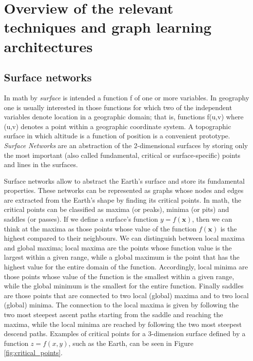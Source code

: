 \chapter{Overview of the relevant techniques and graph learning architectures}
\label{chapter3}
\thispagestyle{plain}

\section{Surface networks}
In math by \textit{surface} is intended a function f of one or more variables. In geography one is usually interested in those functions for which two of the independent variables denote location in a geographic domain; that is, functions f(u,v) where (u,v) denotes a point within a geographic
coordinate system. A topographic surface in which altitude is a function of position is a convenient prototype.  \textit{Surface Networks} are an abstraction of the 2-dimensional surfaces by storing only the most important (also called fundamental, critical or surface-specific) points and lines in the surfaces.

Surface networks allow to abstract the Earth's surface and store its fundamental properties. These networks can be represented as graphs whose nodes and edges are extracted from the Earth's shape by finding its critical points. In math, the critical points can be  classified as maxima (or peaks), minima (or pits) and saddles (or passes).
If we define a surface's function \(y = f(\textbf{x})\), then we can think at the maxima as those points whose value of the function \(f(\textbf{x})\) is the highest compared to their neighbours. We can distinguish between local maxima and global maxima; local maxima are the points whose function value is the largest within a given range, while a global maximum is the point that has the highest value for the entire domain of the function. Accordingly, local minima are those points whose value of the function is the smallest within a given range, while the global minimum is the smallest for the entire function. Finally saddles are those points that are connected to two local (global) maxima and to two local (global) minima. The connection to the local maxima is given by following the two most steepest ascent paths starting from the saddle and reaching the maxima, while the local minima are reached by following the two most steepest descend paths.
Examples of critical points for a 3-dimension surface defined by a function \(z = f(x,y)\), such as the Earth, can be seen in Figure \ref{fig:critical_points}.

